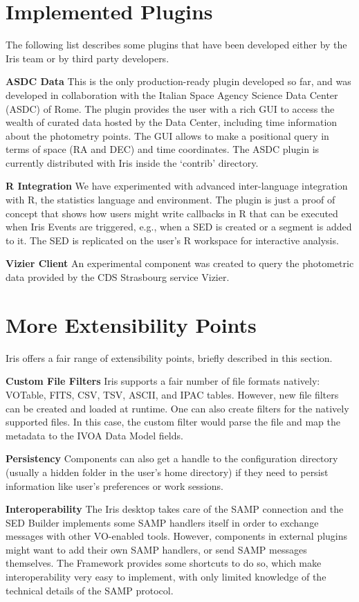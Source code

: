 \section{Implemented Plugins}
The following list describes some plugins that have been developed either by the Iris team or by third party developers.

\textbf{ASDC Data}
This is the only production-ready plugin developed so far, and was developed in collaboration with the Italian Space Agency Science Data Center (ASDC) of Rome. The plugin provides the user with a rich GUI to access the wealth of curated data hosted by the Data Center, including time information about the photometry points. The GUI allows to make a positional query in terms of space (RA and DEC) and time coordinates.
The ASDC plugin is currently distributed with Iris inside the `contrib' directory.

\textbf{R Integration}
We have experimented with advanced inter-language integration with R, the statistics language and environment. The plugin is just a proof of concept that shows how users might write callbacks in R that can be executed when Iris Events are triggered, e.g., when a SED is created or a segment is added to it. The SED is replicated on the user's R workspace for interactive analysis.

\textbf{Vizier Client}
An experimental component was created to query the photometric data provided by the CDS Strasbourg service Vizier.

\section{More Extensibility Points}
Iris offers a fair range of extensibility points, briefly described in this section.

\textbf{Custom File Filters}
Iris supports a fair number of file formats natively: VOTable, FITS, CSV, TSV, ASCII, and IPAC tables. However, new file filters can be created and loaded at runtime. One can also create filters for the natively supported files. In this case, the custom filter would parse the file and map the metadata to the IVOA Data Model fields.

\textbf{Persistency}
Components can also get a handle to the configuration directory (usually a hidden folder in the user's home directory) if they need to persist information like user's preferences or work sessions.

\textbf{Interoperability}
The Iris desktop takes care of the SAMP connection and the SED Builder implements some SAMP handlers itself in order to exchange messages with other VO-enabled tools. However, components in external plugins might want to add their own SAMP handlers, or send SAMP messages themselves. The Framework provides some shortcuts to do so, which make interoperability very easy to implement, with only limited knowledge of the technical details of the SAMP protocol.


